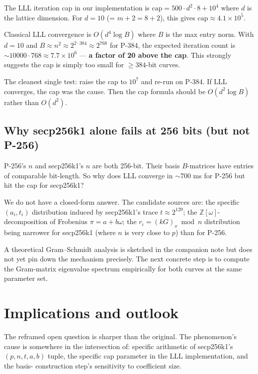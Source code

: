 \documentclass[10pt,a4paper]{article}
\newcommand{\ZZ}{\mathbb{Z}}
\begin{document}
The LLL iteration cap in our implementation is
$\text{cap} = 500 \cdot d^2 \cdot 8 + 10^4$ where $d$ is the
lattice dimension. For $d = 10$ (= $m + 2 = 8 + 2$), this gives
$\text{cap} \approx 4.1 \times 10^5$.

Classical LLL convergence is $O(d^4 \log B)$ where $B$ is the
max entry norm. With $d = 10$ and $B \approx n^2 \approx 2^{2 \cdot 384}
\approx 2^{768}$ for P-384, the expected iteration count is
$\sim 10000 \cdot 768 \approx 7.7 \times 10^6$ — \textbf{a factor
of 20 above the cap}. This strongly suggests the cap is simply
too small for $\geq 384$-bit curves.

The cleanest single test: raise the cap to $10^7$ and re-run on
P-384. If LLL converges, the cap was the cause. Then the cap
formula should be $O(d^2 \log B)$ rather than $O(d^2)$.

\subsection{Why secp256k1 alone fails at 256 bits (but not P-256)}

P-256's $n$ and secp256k1's $n$ are both 256-bit. Their basis
$B$-matrices have entries of comparable bit-length. So why does
LLL converge in $\sim$700 ms for P-256 but hit the cap for
secp256k1?

We do not have a closed-form answer. The candidate sources are:
the specific $(a_i, t_i)$ distribution induced by secp256k1's
trace $t \approx 2^{129}$; the
$\ZZ[\omega]$-decomposition of Frobenius $\pi = a + b\omega$;
the $r_i = (kG)_x \bmod n$ distribution being narrower for
secp256k1 (where $n$ is very close to $p$) than for P-256.

A theoretical Gram--Schmidt analysis is sketched in the companion
note \cite{ourcompanionauditgs} but does not yet pin down the
mechanism precisely. The next concrete step is to compute the
Gram-matrix eigenvalue spectrum empirically for both curves at
the same parameter set.

\section{Implications and outlook}

The reframed open question is sharper than the original. The
phenomenon's cause is somewhere in the intersection of:
specific arithmetic of secp256k1's $(p, n, t, a, b)$ tuple, the
specific cap parameter in the LLL implementation, and the basis-
construction step's sensitivity to coefficient size.
\end{document}

